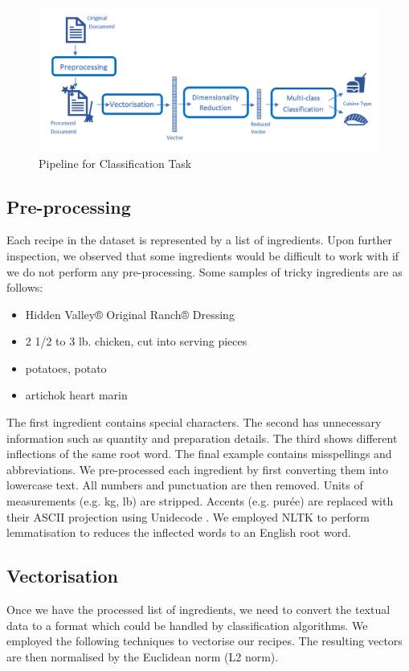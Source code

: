 \documentclass{article}
\def\light#1{{\color{light}#1}}
\begin{document}
\begin{figure}[h]
  \centering
  \includegraphics[width=14cm]{Flowchart.PNG}
  \caption{Pipeline for Classification Task}
  \label{img:pipeline}
\end{figure}

\subsection{Pre-processing}
Each recipe in the dataset is represented by a list of ingredients. Upon further inspection, we observed that some ingredients would be difficult to work with if we do not perform any pre-processing. Some samples of tricky ingredients are as follows:

\begin{itemize}
    \item Hidden Valley® Original Ranch® Dressing
    \item 2 1/2 to 3 lb. chicken, cut into serving pieces
    \item potatoes, potato
    \item artichok heart marin
\end{itemize}


The first ingredient contains special characters. The second has unnecessary information such as quantity and preparation details. The third shows different inflections of the same root word. The final example contains misspellings and abbreviations. We pre-processed each ingredient by first converting them into lowercase text. All numbers and punctuation are then removed. Units of measurements (e.g. kg, lb) are stripped. Accents (e.g. purée) are replaced with their ASCII projection using \light{Unidecode \cite{unidecode}}. We employed \light{NLTK \cite{nltk}} to perform lemmatisation to reduces the inflected words to an English root word.

\subsection{Vectorisation}
Once we have the processed list of ingredients, we need to convert the textual data to a format which could be handled by classification algorithms. We employed the following techniques to vectorise our recipes. The resulting vectors are then normalised by the Euclidean norm (L2 norm).
\end{document}
